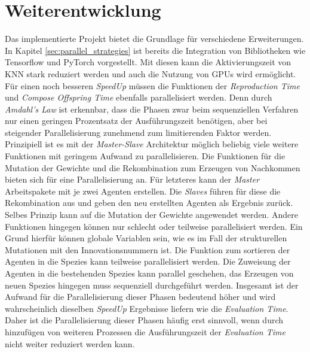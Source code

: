 \section{Weiterentwicklung}
\label{sec:future_work}
Das implementierte Projekt bietet die Grundlage für verschiedene Erweiterungen. In Kapitel \ref{sec:parallel_strategies} ist bereits die Integration von Bibliotheken wie Tensorflow und PyTorch vorgestellt. Mit diesen kann die Aktivierungszeit von \ac{KNN} stark reduziert werden und auch die Nutzung von \acp{GPU} wird ermöglicht. Für einen noch besseren \emph{SpeedUp} müssen die Funktionen der  \emph{Reproduction Time} und \emph{Compose Offspring Time} ebenfalls parallelisiert werden. Denn durch \emph{Amdahl's Law} ist erkennbar, dass die Phasen zwar beim sequenziellen Verfahren nur einen geringen Prozentsatz der Ausführungszeit benötigen, aber bei steigender Parallelisierung zunehmend zum limitierenden Faktor werden. Prinzipiell ist es mit der \emph{Master-Slave} Architektur möglich beliebig viele weitere Funktionen mit geringem Aufwand zu parallelisieren. 
Die Funktionen für die Mutation der Gewichte und die Rekombination zum Erzeugen von Nachkommen bieten sich für eine Parallelisierung an. Für letzteres kann der \emph{Master} Arbeitspakete mit je zwei Agenten erstellen. Die \emph{Slaves} führen für diese die Rekombination aus und geben den neu erstellten Agenten als Ergebnis zurück. Selbes Prinzip kann auf die Mutation der Gewichte angewendet werden. Andere Funktionen hingegen können nur schlecht oder teilweise parallelisiert werden. Ein Grund hierfür können globale Variablen sein, wie es im Fall der strukturellen Mutationen mit den Innovationsnummern ist. Die Funktion zum sortieren der Agenten in die Spezies kann teilweise parallelisiert werden. Die Zuweisung der Agenten in die bestehenden Spezies kann parallel geschehen, das Erzeugen von neuen Spezies hingegen muss sequenziell durchgeführt werden. Insgesamt ist der Aufwand für die Parallelisierung dieser Phasen bedeutend höher und wird wahrscheinlich dieselben \emph{SpeedUp} Ergebnisse liefern wie die \emph{Evaluation Time}. Daher ist die Parallelisierung dieser Phasen häufig erst sinnvoll, wenn durch hinzufügen von weiteren Prozessen die Ausführungszeit der \emph{Evaluation Time} nicht weiter reduziert werden kann. 


